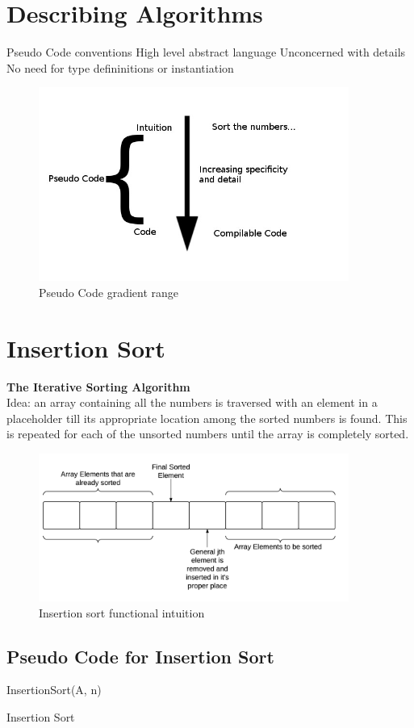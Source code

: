 \documentclass[12pt,letterpaper]{article}
\begin{document}
\section{Describing Algorithms}
Pseudo Code conventions
High level abstract language 
Unconcerned with details
No need for type defininitions or instantiation 
\begin{figure}[h]
\centering
\includegraphics[width=4in]{PseudoCode}
\caption{Pseudo Code gradient range}
\end{figure} 
\section{Insertion Sort}
\textbf{The Iterative Sorting Algorithm}\\
Idea: an array containing all the numbers is traversed with an element
in a placeholder till its appropriate location among the sorted numbers
is found. This is repeated for each of the unsorted numbers until
the array is completely sorted. \\
\begin{figure}[h]
\centering
\includegraphics[width=4in]{ISInutition}
\caption{Insertion sort functional intuition}
\end{figure}
\pagebreak
\subsection{Pseudo Code for Insertion Sort}
\begin{algorithm}[h]
\SetAlgoLined
InsertionSort(A, n)
\caption{Insertion Sort}
\label{Insertion Sort}
\end{algorithm}
\pagebreak
\end{document}
